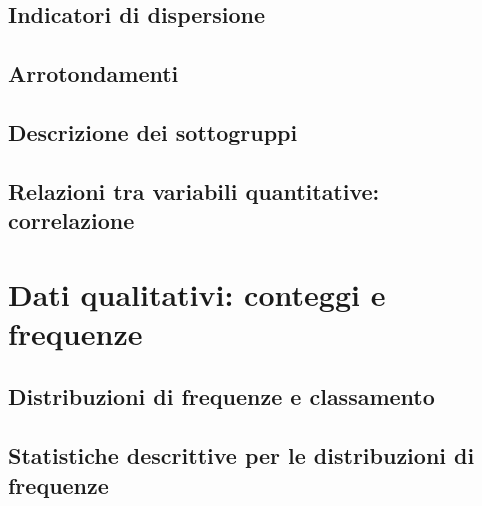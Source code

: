 \documentclass[a4paper,12pt,oneside]{book}
\begin{document}
\hypertarget{indicatori-di-dispersione}{%
\subsection*{Indicatori di dispersione}\label{indicatori-di-dispersione}}

\hypertarget{arrotondamenti}{%
\subsection*{Arrotondamenti}\label{arrotondamenti}}

\hypertarget{descrizione-dei-sottogruppi}{%
\subsection*{Descrizione dei sottogruppi}\label{descrizione-dei-sottogruppi}}

\hypertarget{relazioni-tra-variabili-quantitative-correlazione}{%
\subsection{Relazioni tra variabili quantitative: correlazione}\label{relazioni-tra-variabili-quantitative-correlazione}}

\hypertarget{dati-qualitativi-conteggi-e-frequenze}{%
\section*{Dati qualitativi: conteggi e frequenze}\label{dati-qualitativi-conteggi-e-frequenze}}

\hypertarget{distribuzioni-di-frequenze-e-classamento}{%
\subsection*{Distribuzioni di frequenze e classamento}\label{distribuzioni-di-frequenze-e-classamento}}

\hypertarget{statistiche-descrittive-per-le-distribuzioni-di-frequenze}{%
\subsection*{Statistiche descrittive per le distribuzioni di frequenze}\label{statistiche-descrittive-per-le-distribuzioni-di-frequenze}}
\end{document}
